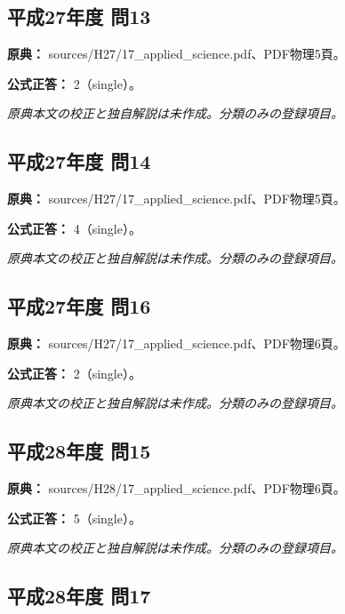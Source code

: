 \subsection{平成27年度 問13}
\label{q:h27-reg-applied-13}

\noindent\textbf{原典：} sources/H27/17\_applied\_science.pdf、PDF物理5頁。

\textbf{公式正答：} 2（single）。

\par\textit{原典本文の校正と独自解説は未作成。分類のみの登録項目。}

\subsection{平成27年度 問14}
\label{q:h27-reg-applied-14}

\noindent\textbf{原典：} sources/H27/17\_applied\_science.pdf、PDF物理5頁。

\textbf{公式正答：} 4（single）。

\par\textit{原典本文の校正と独自解説は未作成。分類のみの登録項目。}

\subsection{平成27年度 問16}
\label{q:h27-reg-applied-16}

\noindent\textbf{原典：} sources/H27/17\_applied\_science.pdf、PDF物理6頁。

\textbf{公式正答：} 2（single）。

\par\textit{原典本文の校正と独自解説は未作成。分類のみの登録項目。}

\subsection{平成28年度 問15}
\label{q:h28-reg-applied-15}

\noindent\textbf{原典：} sources/H28/17\_applied\_science.pdf、PDF物理6頁。

\textbf{公式正答：} 5（single）。

\par\textit{原典本文の校正と独自解説は未作成。分類のみの登録項目。}

\subsection{平成28年度 問17}
\label{q:h28-reg-applied-17}

